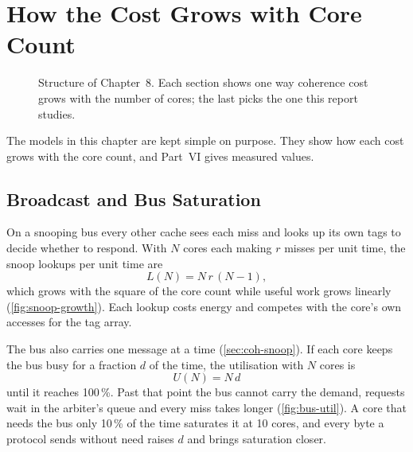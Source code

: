 \chapter{How the Cost Grows with Core Count}
\label{ch:scaling}

\begin{figure}[htbp]
\centering
{}
\caption[]{Structure of Chapter~8. Each section shows one
way coherence cost grows with the number of cores; the last picks the one this
report studies.}
\label{fig:ch8-map}
\end{figure}

The models in this chapter are kept simple on purpose. They show how each cost
grows with the core count, and Part~VI gives measured values.

\section{Broadcast and Bus Saturation}
\label{sec:scale-broadcast}
\label{sec:scale-bus}
%

On a snooping bus every other cache sees each miss and looks up its own tags to
decide whether to respond. With $N$ cores each making $r$ misses per unit time,
the snoop lookups per unit time are
\begin{equation}
  L(N) = N\,r\,(N-1),
  \label{eq:snoop}
\end{equation}
which grows with the square of the core count while useful work grows linearly
(\cref{fig:snoop-growth}). Each lookup costs energy and competes with the core's
own accesses for the tag array.

The bus also carries one message at a time (\cref{sec:coh-snoop}). If each core
keeps the bus busy for a fraction $d$ of the time, the utilisation with $N$ cores
is
\begin{equation}
  U(N) = N\,d
  \label{eq:util}
\end{equation}
until it reaches 100\,\%. Past that point the bus cannot carry the demand,
requests wait in the arbiter's queue and every miss takes longer
(\cref{fig:bus-util}). A core that needs the bus only 10\,\% of the time saturates
it at 10 cores, and every byte a protocol sends without need raises $d$ and brings
saturation closer.

